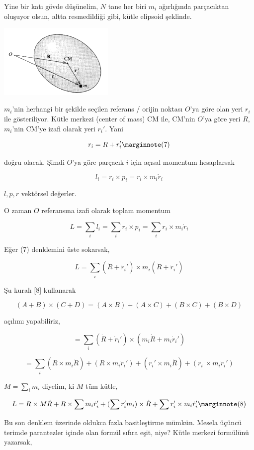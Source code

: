 \documentclass[12pt,fleqn]{article}\usepackage{../../common}
\begin{document}
Yine bir katı gövde düşünelim, $N$ tane her biri $m_i$ ağırlığında parçacıktan
oluşuyor olsun, altta resmedildiği gibi, kütle elipsoid şeklinde.

\includegraphics[width=15em]{phy_005_basics_09.png}

$m_i$'nin herhangi bir şekilde seçilen referans / orijin noktası $O$'ya göre
olan yeri $r_i$ ile gösteriliyor. Kütle merkezi (center of mass) CM ile,
CM'nin $O$'ya göre yeri $R$, $m_i$'nin CM'ye izafi olarak yeri $r_i'$. Yani

$$
r_i = R + r_i'
\mlabel{7}
$$

doğru olacak. Şimdi $O$'ya göre parçacık $i$ için açısal momentum hesaplarsak

$$
l_i = r_i \times p_i = r_i \times m_i \dot{r}_i
$$

$l,p,r$ vektörsel değerler.

O zaman $O$ referansına izafi olarak toplam momentum

$$
L = \sum_i l_i = \sum_i r_i \times p_i = \sum_i r_i \times m_i \dot{r}_i
$$

Eğer (7) denklemini üste sokarsak,

$$
L = \sum_i (\dot{R} + \dot{r}_i') \times m_i (\dot{R} + \dot{r}_i' )
$$

Şu kuralı [8] kullanarak

$$
(A + B) \times (C+D) = (A \times B) + (A \times C) + (B \times C) + (B \times D) 
$$

açılımı yapabiliriz, 

$$
 = \sum_i (\dot{R} + \dot{r}_i') \times (m_i \dot{R} + m_i \dot{r}_i' )
$$


$$
= \sum_i (R \times m_i \dot{R}) +
  (R \times m_i \dot{r}_i') +
  (r_i' \times m_i \dot{R}) +
  (r_i\ \times m_i \dot{r}_i')   
$$

$M = \sum_i m_i$ diyelim, ki $M$ tüm kütle,

$$
L = R \times M\dot{R} +
R \times \sum m_i \dot{r}_i' +
(\sum r_i' m_i) \times \dot{R} +
\sum r_i' \times m_i \dot{r}_i'
\mlabel{8}
$$

Bu son denklem üzerinde oldukca fazla basitleştirme mümkün. Mesela üçüncü
terimde parantezler içinde olan formül sıfıra eşit, niye? Kütle merkezi
formülünü yazarsak,
\end{document}
